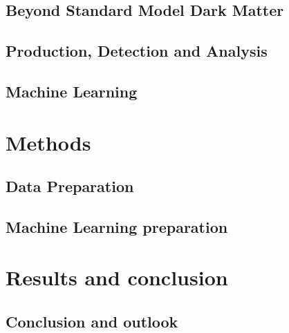 \documentclass[12pt, a4paper]{book}
\begin{document}
\chapter{Beyond Standard Model Dark Matter}\label{chap:DM}


\chapter{Production, Detection and Analysis}\label{chap:CERN_method}


\chapter{Machine Learning}\label{chap:theo_ML}




\part{Methods}
\chapter{Data Preparation}\label{chap:data_prep}


\chapter{Machine Learning preparation}\label{chap:ML}


\part{Results and conclusion}

\chapter{Conclusion and outlook}\label{chap:conclusion}


\clearpage


\appendix
















\clearpage
{}
{}
\printbibliography
\end{document}
